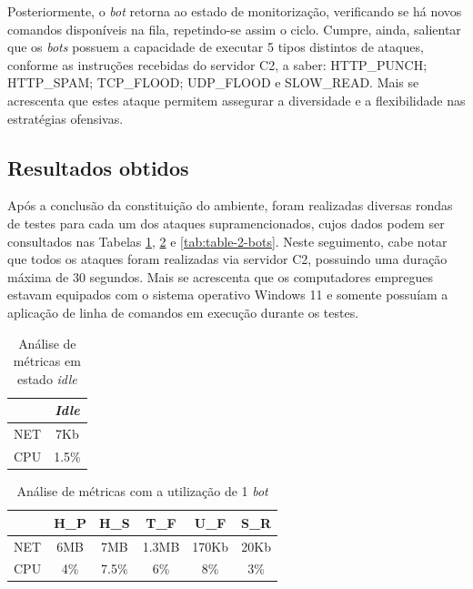 Posteriormente, o \textit{bot} retorna ao estado de monitorização, verificando se há novos comandos disponíveis na fila, repetindo-se assim o ciclo. Cumpre, ainda, salientar que os \textit{bots} possuem a capacidade de executar 5 tipos distintos de ataques, conforme as instruções recebidas do servidor C2, a saber: HTTP\_PUNCH; HTTP\_SPAM; TCP\_FLOOD; UDP\_FLOOD e SLOW\_READ. Mais se acrescenta que estes ataque permitem assegurar a diversidade e a flexibilidade nas estratégias ofensivas.


\subsection{Resultados obtidos}
Após a conclusão da constituição do ambiente, foram realizadas diversas rondas de testes para cada um dos ataques supramencionados, cujos dados podem ser consultados nas Tabelas \ref{tab:table-idle}, \ref{tab:table-1-bot} e \ref{tab:table-2-bots}. Neste seguimento, cabe notar que todos os ataques foram realizadas via servidor C2, possuindo uma duração máxima de 30 segundos. Mais se acrescenta que os computadores empregues estavam equipados com o sistema operativo Windows 11 e somente possuíam a aplicação de linha de comandos em execução durante os testes.


\renewcommand{\tablename}{Tabela}
\begin{table}[!h]
    \renewcommand{\arraystretch}{1.3}
    \caption{Análise de métricas em estado \textit{idle}}
    \label{tab:table-idle}
    \centering
    \begin{tabular}{|c|c|}
        \hline
            & \textit{Idle} \\
        \hline
        NET & 7Kb           \\
        \hline
        CPU & 1.5\%         \\
        \hline
    \end{tabular}
\end{table}


\begin{table}[!h]
    \renewcommand{\arraystretch}{1.3}
    \caption{Análise de métricas com a utilização de 1 \textit{bot}}
    \label{tab:table-1-bot}
    \centering
    \begin{tabular}{|c|c|c|c|c|c|}
        \hline
            & H\_P & H\_S  & T\_F  & U\_F  & S\_R \\
        \hline
        NET & 6MB  & 7MB   & 1.3MB & 170Kb & 20Kb \\
        \hline
        CPU & 4\%  & 7.5\% & 6\%   & 8\%   & 3\%  \\
        \hline
    \end{tabular}
\end{table}

